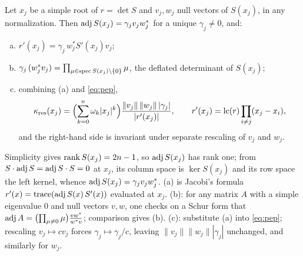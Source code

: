 \begin{lemma}\label{lem:adjugate}
  Let $x_j$ be a simple root of $r=\det S$ and $v_j,w_j$ null vectors of $S(x_j)$, in any
  normalization. Then $\operatorname{adj} S(x_j) = \gamma_jv_jw_j^*$ for a unique $\gamma_j\ne0$, and:
  \begin{enumerate}[(a)]
    \item $r'(x_j) = \gamma_j\,w_j^*S'(x_j)v_j$;
    \item $\gamma_j\,(w_j^*v_j) = \prod_{\mu\in\operatorname{spec} S(x_j)\setminus\{0\}}\mu$, the
      deflated determinant of $S(x_j)$;
    \item combining (a) and \eqref{eq:pep},
      \[
        \kappa_{\mathrm{res}}(x_j)
        = \Bigl(\sum_{k=0}^n\omega_k|x_j|^k\Bigr)
        \frac{\|v_j\|\,\|w_j\|\,|\gamma_j|}{|r'(x_j)|},
        \qquad r'(x_j) = \operatorname{lc}(r)\prod_{i\ne j}(x_j-x_i),
      \]
      and the right-hand side is invariant under separate rescaling of $v_j$ and $w_j$.
  \end{enumerate}
\end{lemma}

\proof
Simplicity gives $\operatorname{rank} S(x_j) = 2n-1$, so $\operatorname{adj} S(x_j)$ has rank one; from
$S\cdot\operatorname{adj} S = \operatorname{adj} S\cdot S = 0$ at $x_j$, its column space is $\ker S(x_j)$ and its row
space the left kernel, whence $\operatorname{adj} S(x_j) = \gamma_jv_jw_j^*$. (a) is Jacobi's formula
$r'(x) = \operatorname{trace}(\operatorname{adj} S(x)\,S'(x))$ evaluated at $x_j$. (b): for any matrix $A$ with a simple
eigenvalue $0$ and null vectors $v,w$, one checks on a Schur form that
$\operatorname{adj} A = \bigl(\prod_{\mu\ne0}\mu\bigr)\frac{vw^*}{w^*v}$; comparison gives (b). (c):
substitute (a) into \eqref{eq:pep}; rescaling $v_j\mapsto cv_j$ forces
$\gamma_j\mapsto\gamma_j/c$, leaving $\|v_j\|\|w_j\||\gamma_j|$ unchanged, and similarly
for $w_j$.
\endproof

